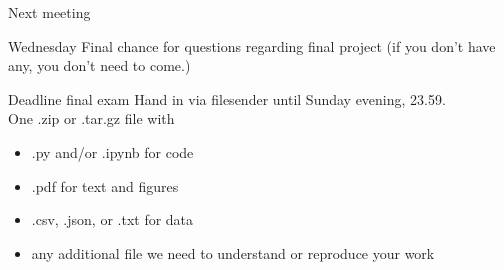 \documentclass{beamer}
\begin{document}
\begin{frame}{Next meeting}
\begin{block}{Wednesday}
	Final chance for questions regarding final project (if you don't have any, you don't need to come.)
\end{block}

\begin{block}{Deadline final exam}
Hand in via filesender until Sunday evening, 23.59.\\
One .zip or .tar.gz file with
\begin{itemize}
	\item .py and/or .ipynb for code
	\item .pdf for text and figures
	\item .csv, .json, or .txt for data
	\item any additional file we need to understand or reproduce your work
\end{itemize}
\end{block}

\end{frame}
\end{document}
